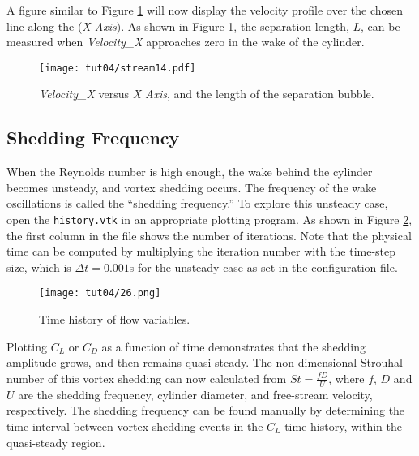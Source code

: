 A figure similar to Figure \ref{fig4:stream14_4} will now display the velocity profile over the chosen line along the (\textit{X Axis}). As shown in Figure \ref{fig4:stream14_4}, the separation length, $L$, can be measured when \textit{Velocity\_X} approaches zero in the wake of the cylinder.
\begin{figure}[ht]
    \centering
    \texttt{[image: tut04/stream14.pdf]}
    \caption{\textit{Velocity\_X} versus \textit{X Axis}, and the length of the separation bubble.}
    \label{fig4:stream14_4}
\end{figure}
\subsection{Shedding Frequency}
When the Reynolds number is high enough, the wake behind the cylinder becomes unsteady, and vortex shedding occurs. The frequency of the wake oscillations is called the ``shedding frequency.'' To explore this unsteady case, open the \texttt{history.vtk} in an appropriate plotting program. As shown in Figure \ref{fig4:time_history}, the first column in the file shows the number of iterations. Note that the physical time can be computed by multiplying the iteration number with the time-step size, which is $\Delta t = 0.001$s for the unsteady case as set in the configuration file.
\begin{figure}[ht]
    \centering
    \texttt{[image: tut04/26.png]}
    \caption{Time history of flow variables.}
    \label{fig4:time_history}
\end{figure}
Plotting $C_L$ or $C_D$ as a function of time demonstrates that the shedding amplitude grows, and then remains quasi-steady. The non-dimensional Strouhal number of this vortex shedding can now calculated from $St=\frac{f D}{U}$, where $f$, $D$ and $U$ are the shedding frequency, cylinder diameter, and free-stream velocity, respectively. The shedding frequency can be found manually by determining the time interval between vortex shedding events in the $C_L$ time history, within the quasi-steady region.
